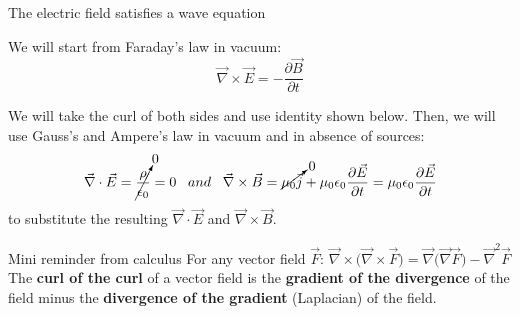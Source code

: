 \begin{frame}{The electric field satisfies a wave equation}

We will start from Faraday's law in vacuum:
\begin{equation*}
  \vec{\nabla} \times \vec{E} = -\frac{\partial \vec{B}}{\partial t}
\end{equation*}

We will take the curl of both sides and use identity shown below.
Then, we will use Gauss's and Ampere's law in vacuum and in absence of sources:
\begin{equation*}
  \vec{\nabla} \cdot \vec{E} =
       \cancelto{0}{\frac{\rho}{\epsilon_0}} = 0
  \;\;\; and \;\;\;
  \vec{\nabla} \times \vec{B} =
        \cancelto{0}{\mu_0 \vec{j}} + \mu_0 \epsilon_0 \frac{\partial \vec{E}}{\partial t} =
        \mu_0 \epsilon_0 \frac{\partial \vec{E}}{\partial t}
\end{equation*}
to substitute the resulting $\vec{\nabla} \cdot \vec{E}$  and $\vec{\nabla} \times \vec{B}$.

\begin{blockminirem}{\small Mini reminder from calculus}
{\small
For any vector field $\vec{F}$:
$\displaystyle \vec{\nabla} \times \Big( \vec{\nabla} \times \vec{F} \Big) = \vec{\nabla} \Big( \vec{\nabla} \vec{F} \Big) - \vec{\nabla}^{2} \vec{F}$\\
\vspace{0.1cm}
The {\bf curl of the curl} of a vector field is
the {\bf gradient of the divergence} of the field minus
the {\bf divergence of the gradient} (Laplacian) of the field.\\
}
\end{blockminirem}

\end{frame}

%
%
%
%

